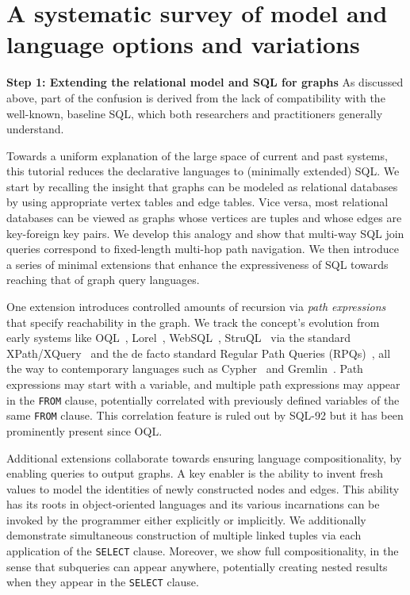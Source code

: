 \section{A systematic survey of model and language options and variations}

\noindent \textbf{Step 1: Extending the relational model and SQL for graphs} As discussed above, part of the confusion is derived from the lack of compatibility with the well-known, baseline SQL, which both researchers and practitioners generally understand.

Towards a uniform explanation of the large space of current and past systems, this tutorial reduces the declarative languages to (minimally extended) SQL.
We start by recalling the insight that graphs can be modeled as relational databases by using appropriate vertex tables and edge tables. Vice versa, most relational databases can be viewed as graphs whose vertices are tuples and whose edges are key-foreign key pairs. We develop this analogy and show that multi-way SQL join queries correspond to fixed-length multi-hop path navigation. We then introduce a series of minimal extensions that enhance the expressiveness of SQL towards reaching that of graph query languages.

One extension introduces controlled amounts of recursion via {\em path expressions} that specify reachability 
in the graph. We track the concept's evolution from early systems like OQL~\cite{oql-dbpl-1989},
Lorel~\cite{lorel}, WebSQL~\cite{websql}, StruQL~\cite{struql} via the standard XPath/XQuery~\cite{XQuery}
and the de facto standard Regular Path Queries (RPQs)~\cite{crpqs}, all the way to
contemporary languages such as Cypher~\cite{cypher} and Gremlin~\cite{gremlin}.
Path expressions may start with a variable, and multiple path expressions may appear in the \texttt{FROM} clause, potentially
correlated with previously defined variables of the same \texttt{FROM} clause. This correlation feature is ruled out by SQL-92 but it has been prominently present since OQL.

Additional extensions collaborate towards ensuring language compositionality, by enabling queries to output graphs.
A key enabler is the ability to invent fresh values to model the identities of newly constructed nodes and edges. This ability has its roots in object-oriented languages and its various incarnations can be invoked by the programmer either explicitly or implicitly.
We additionally demonstrate simultaneous construction of multiple linked tuples via each application of the \texttt{SELECT} clause.
Moreover, we show full compositionality, in the sense that subqueries can appear anywhere, potentially creating nested results when they appear in the \texttt{SELECT} clause.


